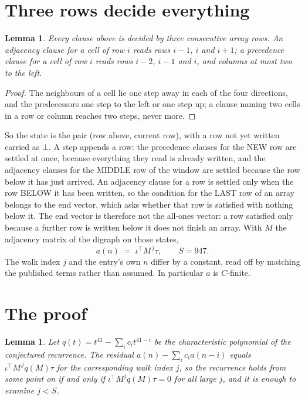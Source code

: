\documentclass[11pt,a4paper]{article}
\theoremstyle{plain}
\newtheorem{lemma}[theorem]{Lemma}
\theoremstyle{definition}
\begin{document}
\section{Three rows decide everything}

\begin{lemma}\label{lem:win}
Every clause above is decided by three consecutive array rows. An adjacency clause for a cell
of row $i$ reads rows $i-1$, $i$ and $i+1$; a precedence clause for a cell of row $i$ reads
rows $i-2$, $i-1$ and $i$, and columns at most two to the left.
\end{lemma}

\begin{proof}
The neighbours of a cell lie one step away in each of the four directions, and the predecessors
one step to the left or one step up; a clause naming two cells in a row or column reaches two
steps, never more.
\end{proof}

So the state is the pair (row above, current row), with a row not yet written carried as
$\bot$. A step appends a row: the precedence clauses for the NEW row are settled at once,
because everything they read is already written, and the adjacency clauses for the MIDDLE row
of the window are settled because the row below it has just arrived. An adjacency clause for a row is settled only when the row BELOW it has been
written, so the condition for the LAST row of an array belongs to the end vector, which asks
whether that row is satisfied with nothing below it. The end vector is therefore not the
all-ones vector: a row satisfied only because a further row is written below it does not
finish an array. With $M$ the
adjacency matrix of the digraph on those states,
\[
a(n)\;=\;\iota^{\!\top}M^{\,j}\tau ,\qquad S=947.
\]
The walk index $j$ and the entry's own $n$ differ by a constant, read off by matching the
published terms rather than assumed. In particular $a$ is $C$-finite.

\section{The proof}

\begin{lemma}\label{lem:crit}
Let $q(t)=t^{41}-\sum_i c_it^{41-i}$ be the characteristic polynomial of the
conjectured recurrence. The residual $a(n)-\sum_ic_ia(n-i)$ equals
$\iota^{\!\top}M^{\,j}q(M)\tau$ for the corresponding walk index $j$, so the recurrence
holds from some point on if and only if $\iota^{\!\top}M^{j}q(M)\tau=0$ for all large $j$,
and it is enough to examine $j<S$.
\end{lemma}
\end{document}
